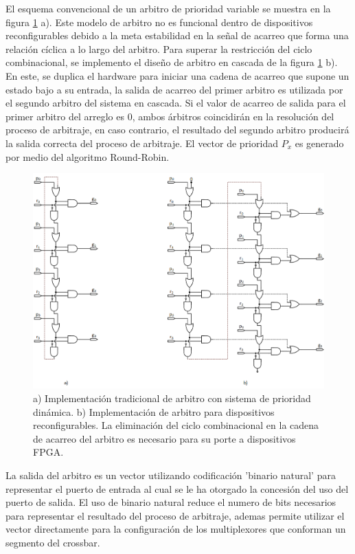 El esquema convencional de un arbitro de prioridad variable se muestra en la figura \ref{fig:ch4_arbitro} a). Este modelo de arbitro no es funcional dentro de dispositivos reconfigurables debido a la meta estabilidad en la señal de acarreo que forma una relación cíclica a lo largo del arbitro. Para superar la restricción del ciclo combinacional, se implemento el diseño de arbitro en cascada de la figura \ref{fig:ch4_arbitro} b). En este, se duplica el hardware para iniciar una cadena de acarreo que supone un estado bajo a su entrada, la salida de acarreo del primer arbitro es utilizada por el segundo arbitro del sistema en cascada.  Si el valor de acarreo de salida para el primer arbitro del arreglo es 0, ambos árbitros coincidirán en la resolución del proceso de arbitraje, en caso contrario, el resultado del segundo arbitro producirá la salida correcta del proceso de arbitraje. El vector de prioridad $P_{x}$ es generado por medio del algoritmo Round-Robin.

\begin{figure}
	\begin{center}
		\includegraphics[width=\linewidth]{figures/ch4_arbitro.png}
	\end{center}
	\caption
		{	
			a) Implementación tradicional de arbitro con sistema de prioridad dinámica. b) Implementación de arbitro para dispositivos reconfigurables. La eliminación del ciclo combinacional en la cadena de acarreo del arbitro es necesario para su porte a dispositivos FPGA.
		}
	\label{fig:ch4_arbitro}
\end{figure}

La salida del arbitro es un vector utilizando codificación 'binario natural' para representar el puerto de entrada al cual se le ha otorgado la concesión del uso del puerto de salida. El uso de binario natural reduce el numero de bits necesarios para representar el resultado del proceso de arbitraje, ademas permite utilizar el vector directamente para la configuración de los multiplexores que conforman un segmento del crossbar.

